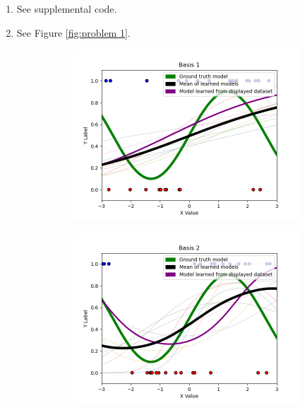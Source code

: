 \documentclass[submit]{harvardml}
\begin{document}
\begin{enumerate}
	\item See supplemental code.
	
	\item See Figure \ref{fig:problem 1}.
	
		\begin{figure}[h]
			\centering
			\begin{subfigure}[b]{0.475\textwidth}
				\includegraphics[width=\textwidth]{Basis 1}
			\end{subfigure}
			\hfill
			\begin{subfigure}[b]{0.475\textwidth}
				\includegraphics[width=\textwidth]{Basis 2}
			\end{subfigure}

\end{figure}
\end{enumerate}
\end{document}
